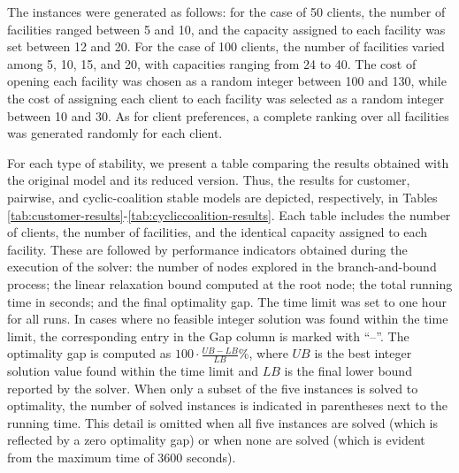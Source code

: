 \documentclass[preprint,11pt,authoryear]{elsarticle}
\begin{document}
The instances were generated as follows: for the case of 50 clients, the number of facilities ranged between 5 and 10, and the capacity assigned to each facility was set between 12 and 20. For the case of 100 clients, the number of facilities varied among 5, 10, 15, and 20, with capacities ranging from 24 to 40. The cost of opening each facility was chosen as a random integer between 100 and 130, while the cost of assigning each client to each facility was selected as a random integer between 10 and 30. As for client preferences, a complete ranking over all facilities was generated randomly for each client.

For each type of stability, we present a table comparing the results obtained with the original model and its reduced version. Thus, the results for customer, pairwise, and cyclic-coalition stable models are depicted, respectively, in Tables \ref{tab:customer-results}-\ref{tab:cycliccoalition-results}. Each table includes the number of clients, the number of facilities, and the identical capacity assigned to each facility. These are followed by performance indicators obtained during the execution of the solver: the number of nodes explored in the branch-and-bound process; the linear relaxation bound computed at the root node; the total running time in seconds; and the final optimality gap. The time limit was set to one hour for all runs. In cases where no feasible integer solution was found within the time limit, the corresponding entry in the Gap column is marked with ``--”. The optimality gap is computed as \(100 \cdot \frac{UB - LB}{LB} \%\), where \(UB\) is the best integer solution value found within the time limit and \(LB\) is the final lower bound reported by the solver. When only a subset of the five instances is solved to optimality, the number of solved instances is indicated in parentheses next to the running time. This detail is omitted when all five instances are solved (which is reflected by a zero optimality gap) or when none are solved (which is evident from the maximum time of 3600 seconds).
\end{document}
